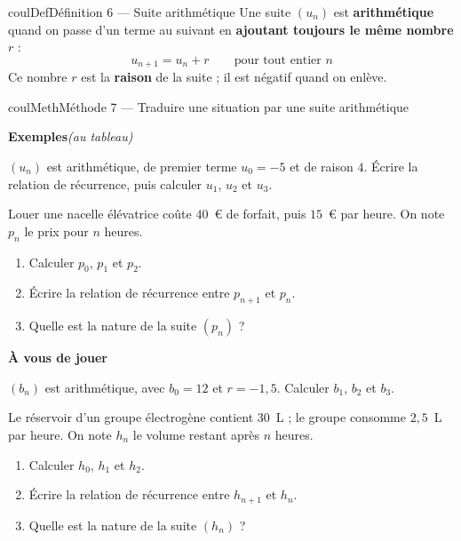 \documentclass[11pt,a4paper]{article}
\makeatletter
\newcounter{lycee@signet}
\newcommand{\signet}[3][]{\stepcounter{lycee@signet}%
  \edef\lycee@dest{\if\relax\detokenize{#1}\relax
    signet.\arabic{lycee@signet}\else#1\fi}%
  \hypertarget{\lycee@dest}{}\bookmark[level=#2,dest=\lycee@dest]{#3}}
\newcounter{methode}
\newenvironment{definitionbox}[1][Définition]%
  {\begin{boitecours}[phantom={\signet{2}{#1}}]{coulDef}{#1}}{\end{boitecours}}
\newenvironment{methodebox}[1][Méthode]{\stepcounter{methode}%
  \begin{boitecours}[phantom={\signet[methode-\arabic{methode}]{2}{#1}}]{coulMeth}{#1}}%
  {\end{boitecours}}
\newcommand{\etape}[1]{\par\smallskip\textbf{\color{coulMeth}#1}\par\nobreak\smallskip}
\newcommand{\autableau}{\hfill{\footnotesize\itshape\color{black!45}(au tableau)}}
\newcommand{\etapeexemples}{%
    \par\smallskip\textbf{\color{coulMeth}Exemples}\autableau\par\nobreak\smallskip}
\makeatother
\begin{document}
\begin{definitionbox}[Définition 6 --- Suite arithmétique]
Une suite $(u_{n})$ est \textbf{arithmétique} quand on passe d'un terme au suivant en
\textbf{ajoutant toujours le même nombre} $r$ :
\[
  \boxed{u_{n+1}=u_{n}+r} \qquad\text{pour tout entier } n
\]
Ce nombre $r$ est la \textbf{raison} de la suite ; il est négatif quand on enlève.
\end{definitionbox}

\begin{center}
\end{center}

\begin{methodebox}[Méthode 7 --- Traduire une situation par une suite arithmétique]
\etapeexemples
\begin{questions}[label=\alph*)]
  \item $(u_{n})$ est arithmétique, de premier terme $u_{0}=-5$ et de raison $4$. Écrire
        la relation de récurrence, puis calculer $u_{1}$, $u_{2}$ et $u_{3}$.
  \item Louer une nacelle élévatrice coûte $40$~€ de forfait, puis $15$~€ par heure. On
        note $p_{n}$ le prix pour $n$ heures.
        \begin{enumerate}[label=\arabic*)]
          \item Calculer $p_{0}$, $p_{1}$ et $p_{2}$.
          \item Écrire la relation de récurrence entre $p_{n+1}$ et $p_{n}$.
          \item Quelle est la nature de la suite $(p_{n})$ ?
        \end{enumerate}
\end{questions}

\etape{À vous de jouer}
\begin{questions}[label=\alph*)]
  \item $(b_{n})$ est arithmétique, avec $b_{0}=12$ et $r=-1{,}5$. Calculer $b_{1}$,
        $b_{2}$ et $b_{3}$.
  \item Le réservoir d'un groupe électrogène contient $30$~L ; le groupe consomme
        $2{,}5$~L par heure. On note $h_{n}$ le volume restant après $n$ heures.
        \begin{enumerate}[label=\arabic*)]
          \item Calculer $h_{0}$, $h_{1}$ et $h_{2}$.
          \item Écrire la relation de récurrence entre $h_{n+1}$ et $h_{n}$.
          \item Quelle est la nature de la suite $(h_{n})$ ?
        \end{enumerate}
\end{questions}

\end{methodebox}
\end{document}
